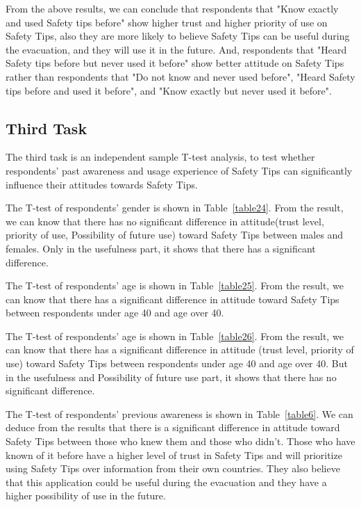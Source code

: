 From the above results, we can conclude that respondents that "Know exactly and used Safety tips before" show higher trust and higher priority of use on Safety Tips, also they are more likely to believe Safety Tips can be useful during the evacuation, and they will use it in the future. And, respondents that "Heard Safety tips before but never used it before" show better attitude on Safety Tips rather than respondents that "Do not know and never used before", "Heard Safety tips before and used it before", and "Know exactly but never used it before".

\subsection{Third Task}

The third task is an independent sample T-test analysis, to test whether respondents' past awareness and usage experience of Safety Tips can significantly influence their attitudes towards Safety Tips. 

The T-test of respondents' gender is shown in Table~\ref{table24}. From the result, we can know that there has no significant difference in attitude(trust level, priority of use, Possibility of future use) toward Safety Tips between males and females. Only in the usefulness part, it shows that there has a significant difference. 

The T-test of respondents' age is shown in Table~\ref{table25}. From the result, we can know that there has a significant difference in attitude toward Safety Tips between respondents under age 40 and age over 40. 

The T-test of respondents' age is shown in Table~\ref{table26}. From the result, we can know that there has a significant difference in attitude (trust level, priority of use) toward Safety Tips between respondents under age 40 and age over 40. But in the usefulness and Possibility of future use part, it shows that there has no significant difference. 


The T-test of respondents' previous awareness is shown in Table~\ref{table6}. We can deduce from the results that there is a significant difference in attitude toward Safety Tips between those who knew them and those who didn't. Those who have known of it before have a higher level of trust in Safety Tips and will prioritize using Safety Tips over information from their own countries. They also believe that this application could be useful during the evacuation and they have a higher possibility of use in the future. 

